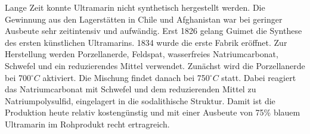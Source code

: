 Lange Zeit konnte Ultramarin nicht synthetisch hergestellt werden. Die Gewinnung aus den Lagerstätten in Chile und Afghanistan war bei geringer Ausbeute sehr zeitintensiv und aufwändig. Erst 1826 gelang Guimet die Synthese des ersten künstlichen Ultramarins. 1834 wurde die erste Fabrik eröffnet. Zur Herstellung werden Porzellanerde, Feldspat, wasserfreies Natriumcarbonat, Schwefel und ein reduzierendes Mittel verwendet. Zunächst wird die Porzellanerde bei 700$^{\circ}C$ aktiviert. Die Mischung findet danach bei 750$^{\circ}C$ statt. Dabei reagiert das Natriumcarbonat mit Schwefel und dem reduzierenden Mittel zu Natriumpolysulfid, eingelagert in die sodalithische Struktur. Damit ist die Produktion heute relativ kostengünstig und mit einer Ausbeute von 75\% blauem Ultramarin im Rohprodukt recht ertragreich. 
\cite{Buxbaum} 
\cite{Seel}
